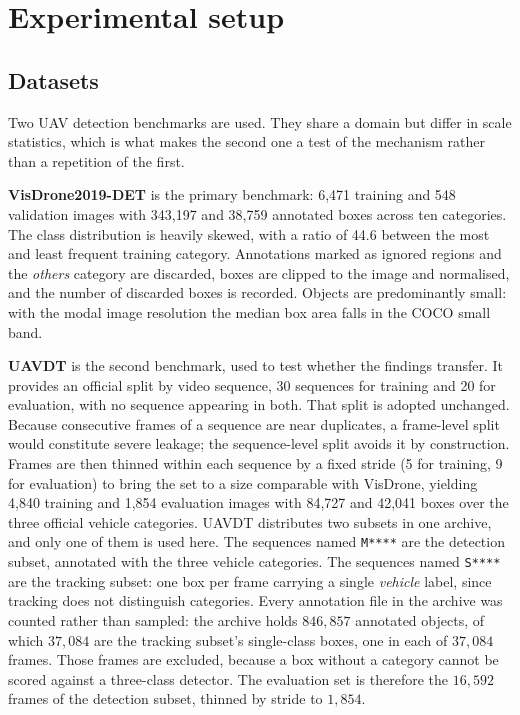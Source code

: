 
\section{Experimental setup}
\label{sec:setup}

\subsection{Datasets}
\label{sec:setup:data}

Two UAV detection benchmarks are used. They share a domain but differ in scale
statistics, which is what makes the second one a test of the mechanism rather than a
repetition of the first.

\textbf{VisDrone2019-DET} is the primary benchmark: 6,471 training and 548 validation
images with 343,197 and 38,759 annotated boxes across ten categories. The class
distribution is heavily skewed, with a ratio of 44.6 between the most and least frequent
training category. Annotations marked as ignored regions and the \emph{others} category
are discarded, boxes are clipped to the image and normalised, and the number of discarded
boxes is recorded. Objects are predominantly small: with the modal image resolution the
median box area falls in the COCO small band.

\textbf{UAVDT} is the second benchmark, used to test whether the findings transfer. It
provides an official split by video sequence, 30 sequences for training and 20 for
evaluation, with no sequence appearing in both. That split is adopted unchanged. Because
consecutive frames of a sequence are near duplicates, a frame-level split would constitute
severe leakage; the sequence-level split avoids it by construction. Frames are then thinned
within each sequence by a fixed stride (5 for training, 9 for evaluation) to bring the set
to a size comparable with VisDrone, yielding 4,840 training and 1,854 evaluation images
with 84,727 and 42,041 boxes over the three official vehicle categories. UAVDT distributes two subsets in one archive, and only one of them is used here. The
sequences named \texttt{M****} are the detection subset, annotated with the three vehicle
categories. The sequences named \texttt{S****} are the tracking subset: one box per frame
carrying a single \emph{vehicle} label, since tracking does not distinguish categories.
Every annotation file in the archive was counted rather than sampled: the archive holds
$846{,}857$ annotated objects, of which $37{,}084$ are the tracking subset's single-class
boxes, one in each of $37{,}084$ frames. Those frames are excluded, because a box without a
category cannot be scored against a three-class detector. The evaluation set is therefore
the $16{,}592$ frames of the detection subset, thinned by stride to $1{,}854$.

